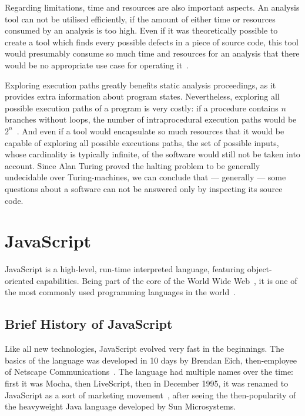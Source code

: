 Regarding limitations, time and resources are also important aspects. An analysis tool can not be utilised efficiently, if the amount of either time or resources consumed by an analysis is too high. Even if it was theoretically possible to create a tool which finds every possible defects in a piece of source code, this tool would presumably consume so much time and resources for an analysis that there would be no appropriate use case for operating it~\cite{anderson2008use}.

Exploring execution paths greatly benefits static analysis proceedings, as it provides extra information about program states. Nevertheless, exploring all possible execution paths of a program is very costly: if a procedure contains $n$ branches without loops, the number of intraprocedural execution paths would be $2^n$~\cite{anderson2008use}. And even if a tool would encapsulate so much resources that it would be capable of exploring all possible executions paths, the set of possible inputs, whose cardinality is typically infinite, of the software would still not be taken into account. Since Alan Turing proved the halting problem to be generally undecidable over Turing-machines, we can conclude that — generally — some questions about a software can not be answered only by inspecting its source code.


\section{JavaScript}

JavaScript is a high-level, run-time interpreted language, featuring object-oriented capabilities. Being part of the core of the World Wide Web~\cite{flanagan2006javascript}, it is one of the most commonly used programming languages in the world~\cite{javascriptstackoverflow}.


\subsection{Brief History of JavaScript}

Like all new technologies, JavaScript evolved very fast in the beginnings. The basics of the language was developed in 10 days by Brendan Eich, then-employee of Netscape Communications~\cite{10.1109/MC.2012.57}. The language had multiple names over the time: first it was Mocha, then LiveScript, then in December 1995, it was renamed to JavaScript as a sort of marketing movement~\cite{webedjavascripthistory}, after seeing the then-popularity of the heavyweight Java language developed by Sun Microsystems.

